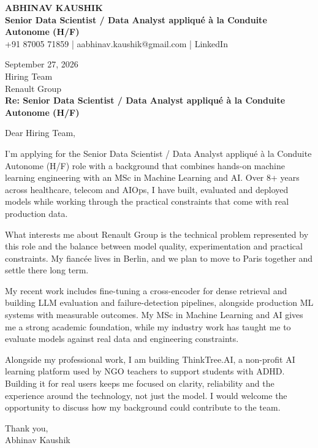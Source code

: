 \documentclass[10pt,a4paper]{article}
\begin{document}
\begin{center}
{\Large\bfseries ABHINAV KAUSHIK}\\[2pt]
{\bfseries Senior Data Scientist / Data Analyst appliqué à la Conduite Autonome (H/F)}\\[2pt]
+91 87005 71859 \quad | \quad aabhinav.kaushik@gmail.com \quad | \quad LinkedIn
\end{center}
\vspace{8pt}
September 27, 2026\\[6pt]
Hiring Team\\
Renault Group\\[4pt]
\textbf{Re: Senior Data Scientist / Data Analyst appliqué à la Conduite Autonome (H/F)}

Dear Hiring Team,

I’m applying for the Senior Data Scientist / Data Analyst appliqué à la Conduite Autonome (H/F) role with a background that combines hands-on machine learning engineering with an MSc in Machine Learning and AI. Over 8+ years across healthcare, telecom and AIOps, I have built, evaluated and deployed models while working through the practical constraints that come with real production data.

What interests me about Renault Group is the technical problem represented by this role and the balance between model quality, experimentation and practical constraints. My fiancée lives in Berlin, and we plan to move to Paris together and settle there long term.

My recent work includes fine-tuning a cross-encoder for dense retrieval and building LLM evaluation and failure-detection pipelines, alongside production ML systems with measurable outcomes. My MSc in Machine Learning and AI gives me a strong academic foundation, while my industry work has taught me to evaluate models against real data and engineering constraints.

Alongside my professional work, I am building ThinkTree.AI, a non-profit AI learning platform used by NGO teachers to support students with ADHD. Building it for real users keeps me focused on clarity, reliability and the experience around the technology, not just the model. I would welcome the opportunity to discuss how my background could contribute to the team.

Thank you,\\
Abhinav Kaushik
\end{document}
